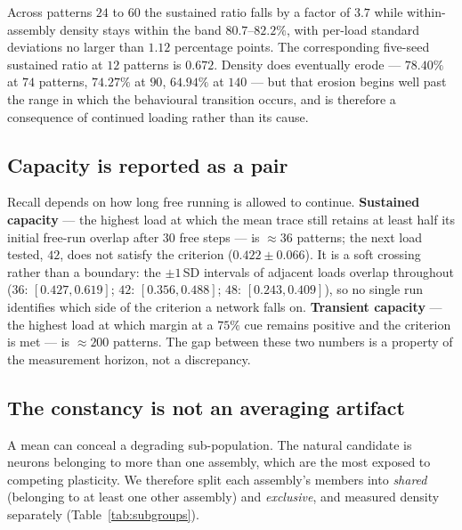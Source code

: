 \documentclass[10pt,twocolumn,a4paper]{article}
\newcommand{\pct}{\%}
\begin{document}
Across patterns $24$ to $60$ the sustained ratio falls by a factor of $3.7$ while
within-assembly density stays within the band $80.7$--$82.2\pct$, with per-load standard
deviations no larger than $1.12$ percentage points. The corresponding five-seed sustained
ratio at $12$ patterns is $0.672$. Density does eventually erode --- $78.40\pct$ at $74$
patterns, $74.27\pct$ at $90$, $64.94\pct$ at $140$ --- but that erosion begins well past
the range in which the behavioural transition occurs, and is therefore a consequence of
continued loading rather than its cause.

\subsection{Capacity is reported as a pair}
Recall depends on how long free running is allowed to continue.
\textbf{Sustained capacity} --- the highest load at which the mean trace still retains at
least half its initial free-run overlap after $30$ free steps --- is $\approx 36$
patterns; the next load tested, $42$, does not satisfy the criterion
($0.422 \pm 0.066$). It is a soft crossing rather than a boundary: the $\pm 1$\,SD
intervals of adjacent loads overlap throughout ($36$: $[0.427,0.619]$; $42$:
$[0.356,0.488]$; $48$: $[0.243,0.409]$), so no single run identifies which side of the
criterion a network falls on. \textbf{Transient capacity} --- the highest load at which
margin at a $75\pct$ cue remains positive and the criterion is met --- is $\approx 200$
patterns. The gap between these two numbers is a property of the measurement horizon, not
a discrepancy.

\subsection{The constancy is not an averaging artifact}
\label{sec:subgroups}

A mean can conceal a degrading sub-population. The natural candidate is neurons belonging
to more than one assembly, which are the most exposed to competing plasticity. We
therefore split each assembly's members into \emph{shared} (belonging to at least one
other assembly) and \emph{exclusive}, and measured density separately
(Table~\ref{tab:subgroups}).
\end{document}

